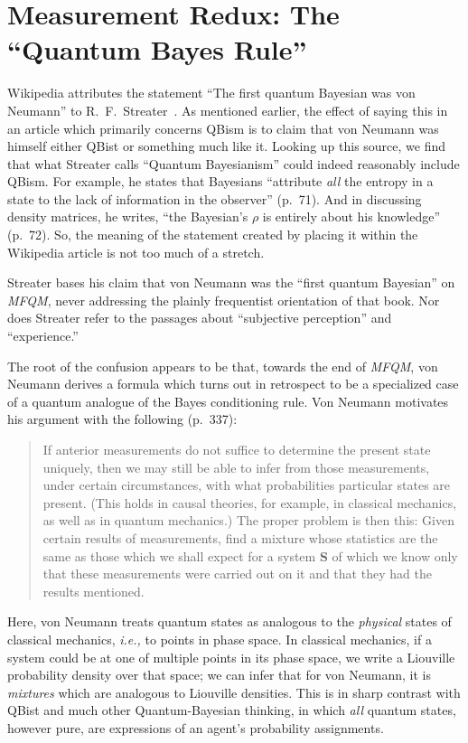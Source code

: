 \documentclass[aps,pra,superscriptaddress,12pt,tightenlines,nofootinbib]{revtex4}
\newcommand{\MFQM}{\textsl{MFQM}}
\begin{document}
\section{Measurement Redux: The ``Quantum Bayes Rule''}

Wikipedia attributes the statement ``The first quantum Bayesian was
von Neumann'' to R.\ F.\ Streater~\cite{Streater2007}.  As mentioned
earlier, the effect of saying this in an article which primarily
concerns QBism is to claim that von Neumann was himself either QBist
or something much like it.  Looking up this source, we find that what
Streater calls ``Quantum Bayesianism'' could indeed reasonably include
QBism.  For example, he states that Bayesians ``attribute \emph{all}
the entropy in a state to the lack of information in the observer''
(p.\ 71).  And in discussing density matrices, he writes, ``the
Bayesian's $\rho$ is entirely about his knowledge'' (p.\ 72).  So, the
meaning of the statement created by placing it within the Wikipedia
article is not too much of a stretch.

Streater bases his claim that von Neumann was the ``first quantum
Bayesian'' on \MFQM, never addressing the plainly frequentist
orientation of that book.  Nor does Streater refer to the passages
about ``subjective perception'' and ``experience.''

The root of the confusion appears to be that, towards the end of
\MFQM, von Neumann derives a formula which turns out in retrospect to
be a specialized case of a quantum analogue of the Bayes conditioning
rule.  Von Neumann motivates his argument with the following
(p.\ 337):
\begin{quotation}
If anterior measurements do not suffice to determine the present state
uniquely, then we may still be able to infer from those measurements,
under certain circumstances, with what probabilities particular states
are present.  (This  holds in causal theories, for example, in
classical mechanics, as well as in quantum mechanics.)  The proper
problem is then this:  Given certain results of measurements, find a
mixture whose statistics are the same as those which we shall expect
for a system {\bf S} of which we know only that these measurements
were carried out on it and that they had the results mentioned.
\end{quotation}
Here, von Neumann treats quantum states as analogous to the
\emph{physical} states of classical mechanics, \emph{i.e.,} to points
in phase space.  In classical mechanics, if a system could be at one
of multiple points in its phase space, we write a Liouville
probability density over that space; we can infer that for von
Neumann, it is \emph{mixtures} which are analogous to Liouville
densities.  This is in sharp contrast with QBist and much other
Quantum-Bayesian thinking, in which \emph{all} quantum states, however
pure, are expressions of an agent's probability assignments.
\end{document}
